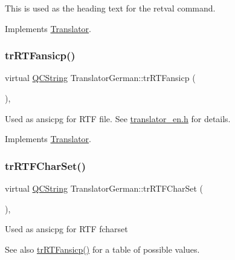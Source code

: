 This is used as the heading text for the retval command. 

Implements \mbox{\hyperlink{class_translator}{Translator}}.

\mbox{\label{class_translator_german_af2c6ee419db83b590ee2bac3378c986b}} 
\subsubsection{\texorpdfstring{trRTFansicp()}{trRTFansicp()}}
{\footnotesize\ttfamily virtual \mbox{\hyperlink{class_q_c_string}{Q\+C\+String}} Translator\+German\+::tr\+R\+T\+Fansicp (\begin{DoxyParamCaption}{ }\end{DoxyParamCaption})\hspace{0.3cm}{\ttfamily [inline]}, {\ttfamily [virtual]}}

Used as ansicpg for R\+TF file. See \mbox{\hyperlink{translator__en_8h_source}{translator\+\_\+en.\+h}} for details. 

Implements \mbox{\hyperlink{class_translator_a9953a4c0e6a4fc7d017abcd5c2939e0f}{Translator}}.

\mbox{\label{class_translator_german_acaec2d8679f438f699e0ce3d96da1e3c}} 
\subsubsection{\texorpdfstring{trRTFCharSet()}{trRTFCharSet()}}
{\footnotesize\ttfamily virtual \mbox{\hyperlink{class_q_c_string}{Q\+C\+String}} Translator\+German\+::tr\+R\+T\+F\+Char\+Set (\begin{DoxyParamCaption}{ }\end{DoxyParamCaption})\hspace{0.3cm}{\ttfamily [inline]}, {\ttfamily [virtual]}}

Used as ansicpg for R\+TF fcharset \begin{DoxySeeAlso}{See also}
\mbox{\hyperlink{class_translator_german_af2c6ee419db83b590ee2bac3378c986b}{tr\+R\+T\+Fansicp()}} for a table of possible values. 
\end{DoxySeeAlso}


